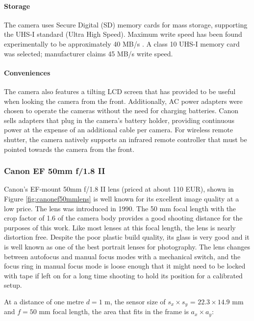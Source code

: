 \paragraph{Storage}
The camera uses Secure Digital (SD) memory cards for mass storage, supporting the UHS-I standard (Ultra High Speed).
Maximum write speed has been found experimentally to be approximately 40 MB/s \cite{magiclanternforum}.
A class 10 UHS-I memory card was selected; manufacturer claims 45 MB/s write speed.

\paragraph{Conveniences}
The camera also features a tilting LCD screen that has provided to be useful when looking the camera from the front.
Additionally, AC power adapters were chosen to operate the cameras without the need for charging batteries.
Canon sells adapters that plug in the camera's battery holder, providing continuous power at the expense of an additional cable per camera.
For wireless remote shutter, the camera natively supports an infrared remote controller that must be pointed towards the camera from the front.


\subsubsection{Canon EF 50mm f/1.8 II}

Canon's EF-mount 50mm f/1.8 II lens (priced at about 110 EUR), shown in Figure \ref{fig:canonef50mmlens} is well known for its excellent image quality at a low price.
The lens was introduced in 1990.
The 50 mm focal length with the crop factor of 1.6 of the camera body provides a good shooting distance for the purposes of this work.
Like most lenses at this focal length, the lens is nearly distortion free.
Despite the poor plastic build quality, its glass is very good and it is well known as one of the best portrait lenses for photography.
The lens changes between autofocus and manual focus modes with a mechanical switch, and the focus ring in manual focus mode is loose enough that it might need to be locked with tape if left on for a long time shooting to hold its position for a calibrated setup.

At a distance of one metre $d = 1$ m, the sensor size of $s_x \times s_y$ = $22.3 \times 14.9$ mm and $f = 50$ mm focal length, the area that fits in the frame is $a_x \times a_y$:

